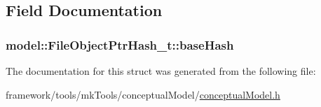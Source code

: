 \subsection{Field Documentation}
\subsubsection[{\texorpdfstring{base\+Hash}{baseHash}}]{ model\+::\+File\+Object\+Ptr\+Hash\+\_\+t\+::base\+Hash\hspace{0.3cm}{\ttfamily [private]}}\hypertarget{structmodel_1_1_file_object_ptr_hash__t_aaceace29dd9e96372549c841c3452253}{}\label{structmodel_1_1_file_object_ptr_hash__t_aaceace29dd9e96372549c841c3452253}


The documentation for this struct was generated from the following file\+:\begin{DoxyCompactItemize}
\item 
framework/tools/mk\+Tools/conceptual\+Model/\hyperlink{conceptual_model_8h}{conceptual\+Model.\+h}\end{DoxyCompactItemize}
